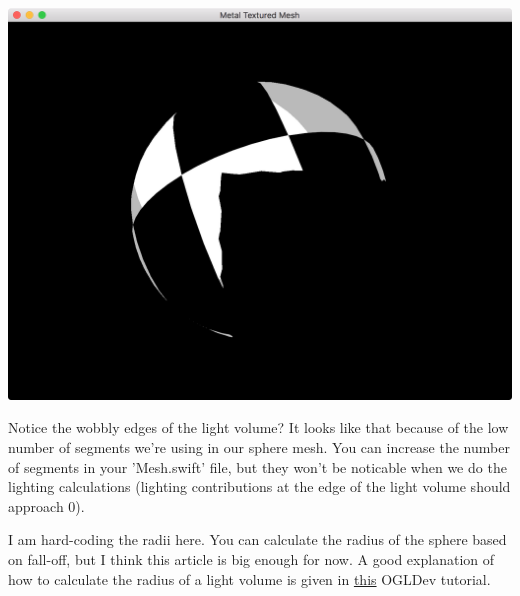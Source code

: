 \documentclass[11pt]{article}
\begin{document}
\begin{center}
\includegraphics[width=.9\linewidth]{../img/posts/implementing-deferred-shading-in-metal/lights-sphere.png}
\end{center}

Notice the wobbly edges of the light volume? It looks like that because of the
low number of segments we're using in our sphere mesh. You can increase the
number of segments in your 'Mesh.swift' file, but they won't be noticable when
we do the lighting calculations (lighting contributions at the edge of the light
volume should approach 0).

I am hard-coding the radii here. You can calculate the radius of the sphere
based on fall-off, but I think this article is big enough for now. A good
explanation of how to calculate the radius of a light volume is given in
\href{http://ogldev.atspace.co.uk/www/tutorial36/tutorial36.html}{this} OGLDev tutorial.
\end{document}
